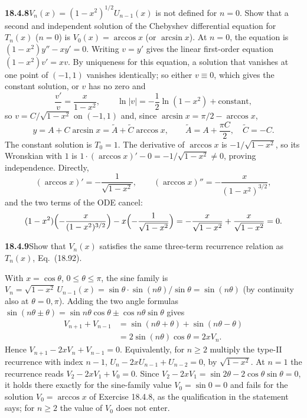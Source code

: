 \par\bigskip
\noindent\textbf{18.4.8}\quad $V_{n}(x)=(1-x^{2})^{1/2}U_{n-1}(x)$ is
not defined for $n=0$. Show that a second and independent solution of
the Chebyshev differential equation for $T_{n}(x)$ ($n=0$) is
$V_{0}(x)=\arccos x$ (or $\arcsin x$).
\solution
At $n=0$, the equation is $(1-x^2)y''-xy'=0$.
Writing $v=y'$ gives the linear first-order equation
$(1-x^2)v'=xv$.  By uniqueness for this equation, a solution that
vanishes at one point of $(-1,1)$ vanishes identically; so either
$v\equiv0$, which gives the constant solution, or $v$ has no zero and
\[
\frac{v'}v=\frac{x}{1-x^2},\qquad
\ln|v|=-\frac12\ln(1-x^2)+\text{constant},
\]
so $v=C/\sqrt{1-x^2}$ on $(-1,1)$ and, since
$\arcsin x=\pi/2-\arccos x$,
\[
y=A+C\arcsin x=\widetilde A+\widetilde C\arccos x,\qquad
\widetilde A=A+\frac{\pi C}2,\quad \widetilde C=-C.
\]
The constant solution is $T_0=1$.  The derivative of $\arccos x$
is $-1/\sqrt{1-x^2}$, so its Wronskian with $1$ is
$1\cdot(\arccos x)'-0=-1/\sqrt{1-x^2}\ne0$, proving independence.
Directly,
\[
(\arccos x)'=-\frac1{\sqrt{1-x^2}},\qquad
(\arccos x)''=-\frac{x}{(1-x^2)^{3/2}},
\]
and the two terms of the ODE cancel:
\[
(1-x^2)\Bigl(-\frac{x}{(1-x^2)^{3/2}}\Bigr)
 -x\Bigl(-\frac1{\sqrt{1-x^2}}\Bigr)
 =-\frac{x}{\sqrt{1-x^2}}+\frac{x}{\sqrt{1-x^2}}=0.
\]

\par\bigskip
\noindent\textbf{18.4.9}\quad Show that $V_{n}(x)$ satisfies the same
three-term recurrence relation as $T_{n}(x)$, Eq.~(18.92).
\par\nobreak
\solution
With $x=\cos\theta$, $0\le\theta\le\pi$, the sine family is
$V_n=\sqrt{1-x^2}\,U_{n-1}(x)=\sin\theta\cdot\sin(n\theta)/\sin\theta
=\sin(n\theta)$ (by continuity also at $\theta=0,\pi$).
Adding the two angle formulas
$\sin(n\theta\pm\theta)=\sin n\theta\cos\theta\pm\cos n\theta\sin\theta$
gives
\begin{align*}
V_{n+1}+V_{n-1}
 &=\sin(n\theta+\theta)+\sin(n\theta-\theta)\\
 &=2\sin(n\theta)\cos\theta=2xV_n.
\end{align*}
Hence $\boxed{V_{n+1}-2xV_n+V_{n-1}=0}$.
Equivalently, for $n\ge2$ multiply the type-II recurrence with
index $n-1$, $U_n-2xU_{n-1}+U_{n-2}=0$, by $\sqrt{1-x^2}$.
At $n=1$ the recurrence reads $V_2-2xV_1+V_0=0$.  Since
$V_2-2xV_1=\sin2\theta-2\cos\theta\sin\theta=0$, it holds there
exactly for the sine-family value $V_0=\sin0=0$ and fails for the
solution $V_0=\arccos x$ of Exercise 18.4.8, as the qualification in
the statement says; for $n\ge2$ the value of $V_0$ does not enter.

